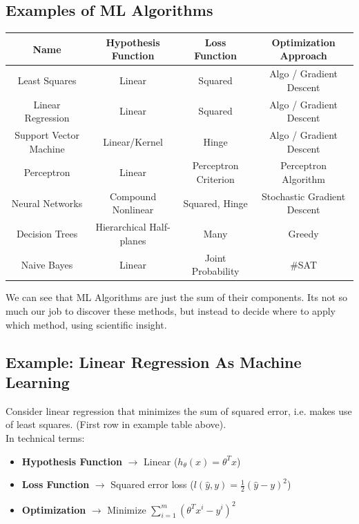 \documentclass[english, 10pt]{article}
\begin{document}
\subsection{Examples of ML Algorithms}

\begin{center}
\begin{tabular}{ |c|c|c|c| } 
 \hline
 \textbf{Name} & \textbf{Hypothesis Function} & \textbf{Loss Function} & \textbf{Optimization Approach} \\ 
 \hline
 Least Squares & Linear & Squared & Algo / Gradient Descent \\
 \hline 
 Linear Regression & Linear & Squared & Algo / Gradient Descent \\
 \hline
 Support Vector Machine & Linear/Kernel & Hinge & Algo / Gradient Descent \\
 \hline
 Perceptron & Linear & Perceptron Criterion & Perceptron Algorithm \\
 \hline
 Neural Networks & Compound Nonlinear & Squared, Hinge & Stochastic Gradient Descent \\
 \hline
 Decision Trees & Hierarchical Half-planes & Many & Greedy \\
 \hline
 Naive Bayes & Linear & Joint Probability & \#SAT \\
 \hline
\end{tabular}
\end{center}

We can see that ML Algorithms are just the sum of their components. Its not so much our job to discover these methods, but instead to decide where to apply which method, using scientific insight.

\subsection{Example: Linear Regression As Machine Learning}

Consider linear regression that minimizes the sum of squared error, i.e. makes use of least squares. (First row in example table above).\\

In technical terms:\\

\begin{myproof}
\begin{itemize}
	\item \textbf{Hypothesis Function} $\rightarrow$ Linear ($h_{\theta}(x)=\theta^T x$)
	\item \textbf{Loss Function} $\rightarrow$ Squared error loss ($l(\hat{y},y)=\frac{1}{2}(\hat{y}-y)^2$)
	\item \textbf{Optimization} $\rightarrow$ Minimize $\sum_{i=1}^{m}(\theta^T x^i-y^i)^2$
\end{itemize}
\end{myproof}
\end{document}
